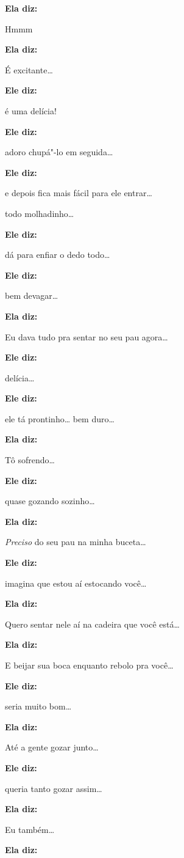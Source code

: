 \textbf{Ela diz:}

Hmmm

\textbf{Ela diz:}

É excitante…

\textbf{Ele diz:}

é uma delícia!

\textbf{Ele diz:}

adoro chupá"-lo em seguida…

\textbf{Ele diz:}

e depois fica mais fácil para ele entrar…

todo molhadinho…

\textbf{Ele diz:}

dá para enfiar o dedo todo…

\textbf{Ele diz:}

bem devagar…

\textbf{Ela diz:}

Eu dava tudo pra sentar no seu pau agora…

\textbf{Ele diz:}

delícia…

\textbf{Ele diz:}

ele tá prontinho… bem duro…

\textbf{Ela diz:}

Tô sofrendo…

\textbf{Ele diz:}

quase gozando sozinho…

\textbf{Ela diz:}

\emph{Preciso} do seu pau na minha buceta…

\textbf{Ele diz:}

imagina que estou aí estocando você…

\textbf{Ela diz:}

Quero sentar nele aí na cadeira que você está…

\textbf{Ela diz:}

E beijar sua boca enquanto rebolo pra você…

\textbf{Ele diz:}

seria muito bom…

\textbf{Ela diz:}

Até a gente gozar junto…

\textbf{Ele diz:}

queria tanto gozar assim…

\textbf{Ela diz:}

Eu também…

\textbf{Ela diz:}

